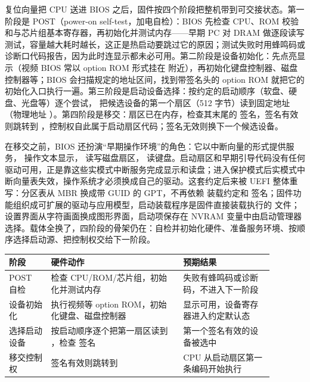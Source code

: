 复位向量把 CPU 送进 BIOS 之后，固件按四个阶段把整机带到可交接状态。第一阶段是 POST（power-on self-test，加电自检）：BIOS 先检查 CPU、ROM 校验和与芯片组基本寄存器，再初始化并测试内存——早期 PC 对 DRAM 做逐段读写测试，容量越大耗时越长，这正是热启动要跳过它的原因；测试失败时用蜂鸣码或诊断口代码报告，因为此时连显示都未必可用。第二阶段是设备初始化：先点亮显示（视频 BIOS 常以 option ROM 形式挂在  附近），再初始化键盘控制器、磁盘控制器等；BIOS 会扫描规定的地址区间，找到带签名头的 option ROM 就把它的初始化入口执行一遍。第三阶段是启动设备选择：按约定的启动顺序（软盘、硬盘、光盘等）逐个尝试， 把候选设备的第一个扇区（512 字节）读到固定地址 （物理地址 ）。第四阶段是移交：扇区已在内存，检查其末尾的  签名，签名有效则跳转到 ，控制权自此属于启动扇区代码；签名无效则换下一个候选设备。

在移交之前，BIOS 还扮演“早期操作环境”的角色：它以中断向量的形式提供服务， 操作文本显示， 读写磁盘扇区， 读键盘。启动扇区和早期引导代码没有任何驱动可用，正是靠这些实模式中断服务完成显示和读盘；进入保护模式后实模式中断向量表失效，操作系统才必须换成自己的驱动。这套约定后来被 UEFI 整体重写：分区表从 MBR 换成带 GUID 的 GPT，不再依赖  装载约定和  签名；固件功能组织成可扩展的驱动与应用模型，启动装载程序是固件直接装载执行的  文件；设置界面从字符画面换成图形界面，启动项保存在 NVRAM 变量中由启动管理器选择。载体全换了，四阶段的骨架仍在：自检并初始化硬件、准备服务环境、按顺序选择启动源、把控制权交给下一阶段。

\begin{longtable}{L{0.14\linewidth}L{0.44\linewidth}L{0.30\linewidth}}
\toprule
阶段 & 硬件动作 & 预期结果 \\
\midrule
POST 自检 & 检查 CPU/ROM/芯片组，初始化并测试内存 & 失败有蜂鸣码或诊断码，不进入下一阶段 \\
设备初始化 & 执行视频等 option ROM，初始化键盘、磁盘控制器 & 显示可用，设备寄存器进入约定默认态 \\
选择启动设备 & 按启动顺序逐个把第一扇区读到 ，检查  签名 & 第一个签名有效的设备被选中 \\
移交控制权 & 签名有效则跳转到  & CPU 从启动扇区第一条编码开始执行 \\
\bottomrule
\end{longtable}

